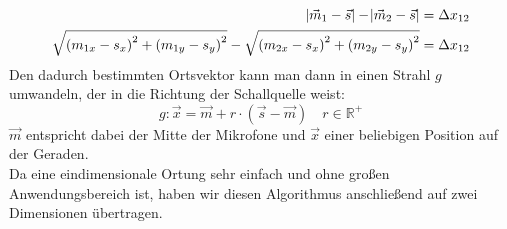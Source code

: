 \begin{align}
\abs{\vec{m}_1 - \vec{s}} - \abs{\vec{m}_2 - \vec{s}} &= \Delta{x_{12}}\\
\sqrt{{(m_{1x} - s_x)}^2 + {(m_{1y} - s_y)}^2} - \sqrt{{(m_{2x} - s_x)}^2 + {(m_{2y} - s_y)}^2} &= \Delta{x_{12}}
\end{align}
Den dadurch bestimmten Ortsvektor kann man dann in einen Strahl $g$ umwandeln, der in die Richtung der Schallquelle weist:
\begin{equation}
g: \vec{x} = \vec{m} + r \cdot (\vec{s} - \vec{m})\quad r \in \mathbb{R}^+
\end{equation}
$\vec{m}$ entspricht dabei der Mitte der Mikrofone und $\vec{x}$ einer beliebigen Position auf der Geraden.\\
Da eine eindimensionale Ortung sehr einfach und ohne großen Anwendungsbereich ist, haben wir diesen Algorithmus anschließend auf zwei Dimensionen übertragen.
